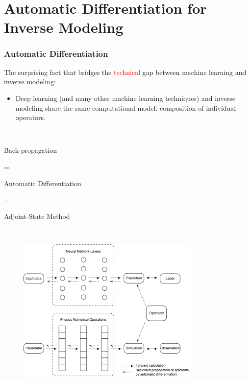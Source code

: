 \documentclass{beamer}
\begin{document}
\section{Automatic Differentiation for Inverse Modeling}

\begin{frame}
	\frametitle{Automatic Differentiation}
The surprising fact that bridges the \textcolor{red}{technical} gap between machine learning and inverse modeling:
	\begin{itemize}
		\item Deep learning (and many other machine learning techniques) and inverse modeling share the same computational model: composition of individual operators. 
	\end{itemize}
	

\begin{minipage}[t]{0.4\textwidth}

\



\begin{center}
	Back-propagation 

= 

 Automatic Differentiation 

=
 
 Adjoint-State Method
\end{center}
\end{minipage}~
\begin{minipage}[t]{0.6\textwidth}
\begin{figure}[hbt]
  \includegraphics[width=0.8\textwidth]{../compare-NN-PDE.png}
\end{figure}
\end{minipage}

\end{frame}
\end{document}
